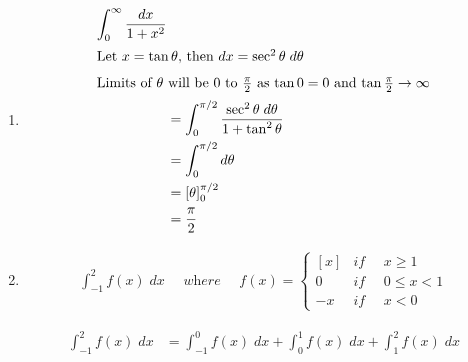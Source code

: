 \begin{enumerate}
\begin{solution}
\begin{enumerate}
                \item
                    \begin{align*}
                        \int_0^\infty \frac{dx}{1 + x^2} \\
                        \intertext{Let \( x = \tan \theta \), then \( dx = \sec^2 \theta \; d\theta \)}
                        \intertext{Limits of \( \theta \) will be \( 0 \) to \( \frac{\pi}{2} \) as \( \tan 0 = 0 \) and \( \tan \frac{\pi}{2} \to \infty \)}
                        &= \int_0^{\pi/2} \frac{\sec^2 \theta \; d\theta}{1 + \tan^2 \theta}\\
                        &= \int_0^{\pi/2} d\theta\\
                        &= \left[\theta\right]_0^{\pi/2}\\
                        &= \frac{\pi}{2}
                    \end{align*}
\BgThispage
                \item
                    \begin{align*}
                        \int_{-1}^2 f(x) \; dx \quad\textit{ where } \quad f(x)= \begin{cases}
                            [x] & \textit{if }\quad x \geq 1\\
                            0 & \textit{if } \quad 0 \leq x < 1\\
                            -x & \textit{if } \quad x < 0
                        \end{cases}
                    \end{align*}
                    \begin{center}
                    \end{center}
                    \begin{align*}
                        \int_{-1}^2 f(x) \; dx &= \int_{-1}^0 f(x) \; dx + \int_{0}^1 f(x) \; dx + \int_{1}^2 f(x) \; dx\\

\end{align*}
\end{enumerate}
\end{solution}
\end{enumerate}
